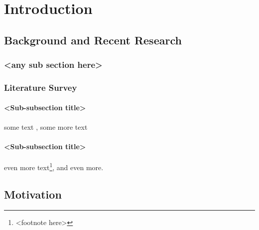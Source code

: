 \chapter{Introduction}

\section{Background and Recent Research}
\subsection{<any sub section here>}

\subsection{Literature Survey}

\subsubsection{<Sub-subsection title>}
some text \citep{knuthwebsite} \citet{latexcompanion}, some more text

\subsubsection{<Sub-subsection title>}
even more text\footnote{<footnote here>}, and even more.

\section{Motivation}
